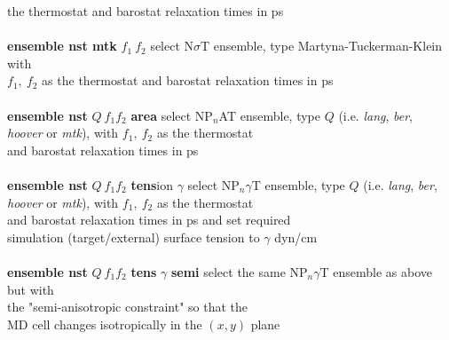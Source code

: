 \begin{tabbing}
\>                                              \> the thermostat and barostat relaxation times in ps \\
\>                                              \> \\
\> {\bf ensemble nst mtk} $f_{1}~f_{2}$         \> select N$\sigma$T ensemble, type Martyna-Tuckerman-Klein with \\
\>                                              \> $f_{1},~f_{2}$ as the thermostat and barostat relaxation times in ps \\
\>                                              \> \\
\> {\bf ensemble nst} $Q~f_{1} f_{2}$ {\bf area} \> select NP$_{n}$AT ensemble, type $Q$ (i.e. {\em lang}, {\em ber}, \\
\>                                              \> {\em hoover} or {\em mtk}), with $f_{1},~f_{2}$ as the thermostat \\
\>                                              \> and barostat relaxation times in ps \\
\>                                              \> \\
\> {\bf ensemble nst} $Q~f_{1} f_{2}$ {\bf tens}ion $\gamma$ \> select NP$_{n}\gamma$T ensemble, type $Q$ (i.e. {\em lang}, {\em ber}, \\
\>                                              \> {\em hoover} or {\em mtk}), with $f_{1},~f_{2}$ as the thermostat \\
\>                                              \> and barostat relaxation times in ps and set required \\
\>                                              \> simulation (target/external) surface tension to $\gamma$ dyn/cm \\
\>                                              \> \\
\> {\bf ensemble nst} $Q~f_{1} f_{2}$ {\bf tens} $\gamma$ {\bf semi}
                                                \> \phantom{xxx} select the same NP$_{n}\gamma$T ensemble as above but with \\
\>                                              \> \phantom{xxx} the "semi-anisotropic constraint" so that the\\
\>                                              \> \phantom{xxx} MD cell changes isotropically in the $(x,y)$ plane \\

\end{tabbing}
